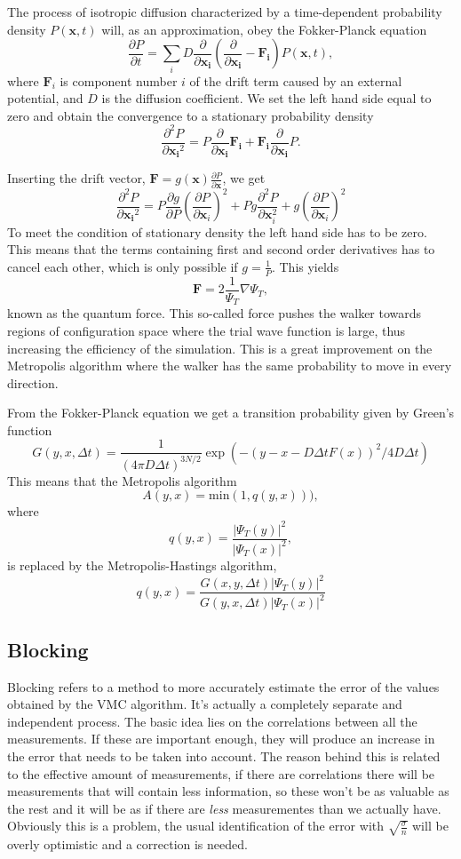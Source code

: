 \documentclass[11pt]{article}
\begin{document}
The process of isotropic diffusion characterized by a time-dependent
probability density $P\left(\mathbf{x},t\right)$ will, as an approximation,
obey the Fokker-Planck equation 
\[
\frac{\partial P}{\partial t}=\sum_{i}D\frac{\partial}{\partial\mathbf{x_{i}}}\left(\frac{\partial}{\partial\mathbf{x_{i}}}-\mathbf{F_{i}}\right)P(\mathbf{x},t),
\]
where $\mathbf{F}_{i}$ is component number $i$ of the drift term
caused by an external potential, and $D$ is the diffusion coefficient.
We set the left hand side equal to zero and obtain the convergence
to a stationary probability density
\[
\frac{\partial^{2}P}{\partial{\mathbf{x_{i}}^{2}}}=P\frac{\partial}{\partial{\mathbf{x_{i}}}}\mathbf{F_{i}}+\mathbf{F_{i}}\frac{\partial}{\partial{\mathbf{x_{i}}}}P.
\]


Inserting the drift vector, $\mathbf{F}=g(\mathbf{x})\frac{\partial P}{\partial\mathbf{x}}$,
we get
\[
\frac{\partial^{2}P}{\partial{\mathbf{x_{i}}^{2}}}=P\frac{\partial g}{\partial P}\left(\frac{\partial P}{\partial{\mathbf{x}_{i}}}\right)^{2}+Pg\frac{\partial^{2}P}{\partial{\mathbf{x}_{i}^{2}}}+g\left(\frac{\partial P}{\partial{\mathbf{x}_{i}}}\right)^{2}
\]
To meet the condition of stationary density the left hand side has
to be zero. This means that the terms containing first and second
order derivatives has to cancel each other, which is only possible
if $g=\frac{1}{P}$. This yields
\[
\mathbf{F}=2\frac{1}{\Psi_{T}}\nabla\Psi_{T},
\]
known as the quantum force. This so-called force pushes the walker
towards regions of configuration space where the trial wave function
is large, thus increasing the efficiency of the simulation. This is
a great improvement on the Metropolis algorithm where the walker has
the same probability to move in every direction.

From the Fokker-Planck equation we get a transition probability given
by Green's function
\[
G(y,x,\Delta t)=\frac{1}{(4\pi D\Delta t)^{3N/2}}\exp{\left(-(y-x-D\Delta tF(x))^{2}/4D\Delta t\right)}
\]
This means that the Metropolis algorithm
\[
A(y,x)=\mathrm{min}(1,q(y,x))),
\]
where 
\[
q(y,x)=\frac{|\Psi_{T}(y)|^{2}}{|\Psi_{T}(x)|^{2}},
\]
is replaced by the Metropolis-Hastings algorithm,
\[
q(y,x)=\frac{G(x,y,\Delta t)|\Psi_{T}(y)|^{2}}{G(y,x,\Delta t)|\Psi_{T}(x)|^{2}}
\]


		\subsection{Blocking}
			Blocking refers to a method to more accurately estimate the error of the values obtained by the VMC algorithm. It's actually a completely separate and independent process. The basic idea lies on the correlations between all the measurements. If these are important enough, they will produce an increase in the error that needs to be taken into account. The reason behind this is related to the effective amount of measurements, if there are correlations there will be measurements that will contain less information, so these won't be as valuable as the rest and it will be as if there are \textit{less} measurementes than we actually have. Obviously this is a problem, the usual identification of the error with $\sqrt{\frac{\sigma}{n}}$ will be overly optimistic and a correction is needed.\\
\end{document}
